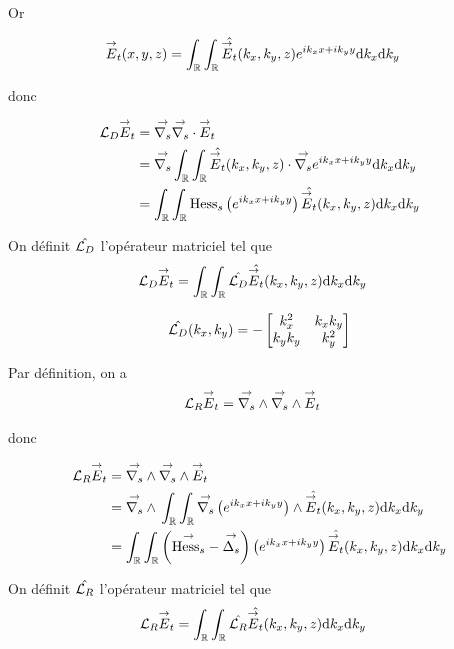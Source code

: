     Or 

    \begin{align}
      \vE_t(x,y,z) & = \int_\RR\int_\RR \hat{\vE_t}(k_x,k_y,z)e^{ik_xx + ik_yy}\dd{k_x}\dd{k_y}
    \end{align}


    donc

    \begin{align}
      \LD \vE_t 
      & = \vgrads{} \vdivs{} \vE_t 
      \\
      &=\vgrads{} \int_\RR\int_\RR \hat{\vE_t}(k_x,k_y,z) \cdot \vgrads{} e^{ik_xx + ik_yy}\dd{k_x}\dd{k_y}
      \\
      &=\int_\RR\int_\RR  \mhesss{}\left( e^{ik_xx + ik_yy} \right) \hat{\vE_t}(k_x,k_y,z)\dd{k_x}\dd{k_y}
    \end{align}

    On définit \(\hat{\LD}\) l'opérateur matriciel tel que
    \begin{align}
      \LD \vE_t 
      &= \int_\RR\int_\RR \hat{\LD} \hat{\vE_t}(k_x,k_y,z)\dd{k_x}\dd{k_y}
    \end{align}

    \begin{equation}
      \hat{\LD}(k_x,k_y) = -
      \begin{bmatrix}
        k_x^2 & k_x k_y 
        \\
        k_y k_y & k_y^2
      \end{bmatrix}
    \end{equation}


    Par définition, on a 
    \begin{align}
      \LR \vE_t & = \vrots{} \vrots{} \vE_t
    \end{align}

    donc

    \begin{align}
      \LR \vE_t 
      & = \vrots{} \vrots{} \vE_t 
      \\
      &=\vrots{} \int_\RR\int_\RR \vgrads{}\left(e^{ik_xx + ik_yy}\right) \pvect \hat{\vE_t}(k_x,k_y,z)\dd{k_x}\dd{k_y}
      \\
      &= \int_\RR\int_\RR \left(\vhesss - \vlapls\right) \left(e^{ik_xx + ik_yy}\right) \hat{\vE_t}(k_x,k_y,z)\dd{k_x}\dd{k_y}
      \\
    \end{align}

    On définit \(\hat{\LR}\) l'opérateur matriciel tel que
    \begin{align}
      \LR \vE_t 
      &= \int_\RR\int_\RR \hat{\LR} \hat{\vE_t}(k_x,k_y,z)\dd{k_x}\dd{k_y}
    \end{align}

